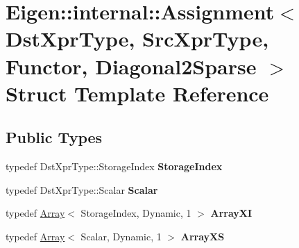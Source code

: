 \hypertarget{struct_eigen_1_1internal_1_1_assignment_3_01_dst_xpr_type_00_01_src_xpr_type_00_01_functor_00_01_diagonal2_sparse_01_4}{}\section{Eigen\+::internal\+::Assignment$<$ Dst\+Xpr\+Type, Src\+Xpr\+Type, Functor, Diagonal2\+Sparse $>$ Struct Template Reference}
\label{struct_eigen_1_1internal_1_1_assignment_3_01_dst_xpr_type_00_01_src_xpr_type_00_01_functor_00_01_diagonal2_sparse_01_4}
\subsection*{Public Types}
\begin{DoxyCompactItemize}
\item 
\mbox{\label{struct_eigen_1_1internal_1_1_assignment_3_01_dst_xpr_type_00_01_src_xpr_type_00_01_functor_00_01_diagonal2_sparse_01_4_a73be07480adf7672b8da352df4a94899}} 
typedef Dst\+Xpr\+Type\+::\+Storage\+Index {\bfseries Storage\+Index}
\item 
\mbox{\label{struct_eigen_1_1internal_1_1_assignment_3_01_dst_xpr_type_00_01_src_xpr_type_00_01_functor_00_01_diagonal2_sparse_01_4_a5e5ba1c28271d8b5c037d1668005ff46}} 
typedef Dst\+Xpr\+Type\+::\+Scalar {\bfseries Scalar}
\item 
\mbox{\label{struct_eigen_1_1internal_1_1_assignment_3_01_dst_xpr_type_00_01_src_xpr_type_00_01_functor_00_01_diagonal2_sparse_01_4_aa1aea4ab1d5785a977226ec4ee5a0a4b}} 
typedef \mbox{\hyperlink{class_eigen_1_1_array}{Array}}$<$ Storage\+Index, Dynamic, 1 $>$ {\bfseries Array\+XI}
\item 
\mbox{\label{struct_eigen_1_1internal_1_1_assignment_3_01_dst_xpr_type_00_01_src_xpr_type_00_01_functor_00_01_diagonal2_sparse_01_4_a7c1af253f38daf8f551b6e5809fce5a1}} 
typedef \mbox{\hyperlink{class_eigen_1_1_array}{Array}}$<$ Scalar, Dynamic, 1 $>$ {\bfseries Array\+XS}
\end{DoxyCompactItemize}
